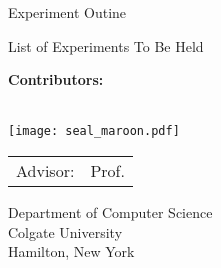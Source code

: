 \documentclass[../exps.tex]{subfiles}
\begin{document}
\pagestyle{empty}

\begin{titlepage}
	\begin{center}\large

		\vfill
		\vfill
		\vfill
		\vfill

		\vspace*{1.35cm}

		{\bfseries{\Large{Experiment Outine\par}}}
		List of Experiments To Be Held
		\vspace*{1.35cm}
		
		\textbf{Contributors:} \\
		\AuthorA\\

		\vspace*{1.35cm}

        \texttt{[image: seal\_maroon.pdf]}

		\vspace*{6.0mm}
		\begin{tabular}{rl}
			Advisor: & Prof. \Prof\\
		\end{tabular}

		\vspace*{7mm}


		\vspace*{7mm}
		Department of Computer Science \\
		Colgate University \\
		Hamilton, New York

		\vspace*{12mm}
		\vfill
	\end{center}

\end{titlepage}
\end{document}
